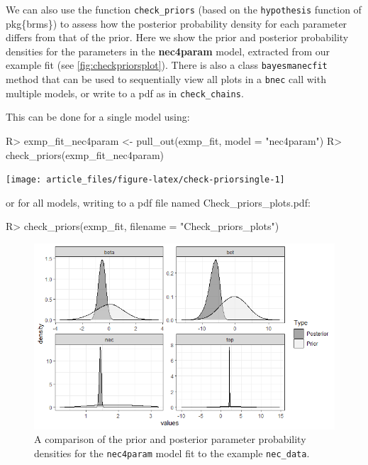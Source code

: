 \documentclass[
]{jss}
\begin{document}
We can also use the function \texttt{check\_priors} (based on the
\texttt{hypothesis} function of pkg\{brms\}) to assess how the posterior
probability density for each parameter differs from that of the prior.
Here we show the prior and posterior probability densities for the
parameters in the \textbf{nec4param} model, extracted from our example
fit (see \autoref{fig:checkpriorsplot}). There is also a class
\texttt{bayesmanecfit} method that can be used to sequentially view all
plots in a \texttt{bnec} call with multiple models, or write to a pdf as
in \texttt{check\_chains}.

This can be done for a single model using:

\begin{CodeChunk}
\begin{CodeInput}
R> exmp_fit_nec4param <- pull_out(exmp_fit, model = "nec4param")
R> check_priors(exmp_fit_nec4param)
\end{CodeInput}


\begin{center}\texttt{[image: article\_files/figure-latex/check-priorsingle-1]} \end{center}

\end{CodeChunk}

or for all models, writing to a pdf file named Check\_priors\_plots.pdf:

\begin{CodeChunk}
\begin{CodeInput}
R> check_priors(exmp_fit, filename = "Check_priors_plots")
\end{CodeInput}
\end{CodeChunk}

\begin{figure}
\centering
\includegraphics{check_prior.png}
\caption{A comparison of the prior and posterior parameter probability
densities for the \texttt{nec4param} model fit to the example
\texttt{nec\_data}.\label{fig:checkpriorsplot}}
\end{figure}
\end{document}
